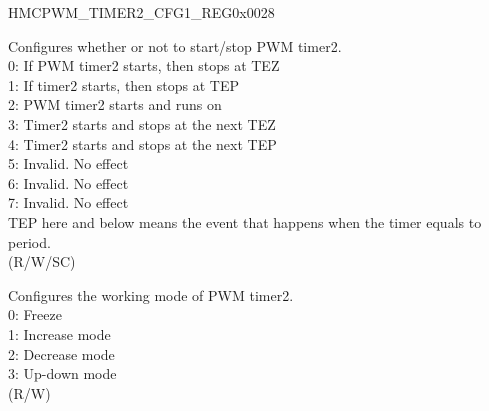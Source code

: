 \begin{register}{H}{MCPWM\_TIMER2\_CFG1\_REG}{0x0028}\label{regdesc:MCPWMTIMER2CFG1REG}
%
%
%
\regnewline%
\begin{regdesc}\begin{reglist}
\label{fielddesc:MCPWMTIMER2START}\item [MCPWM\_TIMER2\_START] Configures whether or not to start/stop PWM timer2.
\\0: If PWM timer2 starts, then stops at TEZ
\\1: If timer2 starts, then stops at TEP
\\2: PWM timer2 starts and runs on
\\3: Timer2 starts and stops at the next TEZ
\\4: Timer2 starts and stops at the next TEP
\\5: Invalid. No effect
\\6: Invalid. No effect
\\7: Invalid. No effect
\\TEP here and below means the event that happens when the timer equals to period.
\\(R/W/SC)
\label{fielddesc:MCPWMTIMER2MOD}\item [MCPWM\_TIMER2\_MOD] Configures the working mode of PWM timer2.
\\0: Freeze
\\1: Increase mode
\\2: Decrease mode
\\3: Up-down mode
\\ (R/W)
\end{reglist}\end{regdesc}
\end{register}


